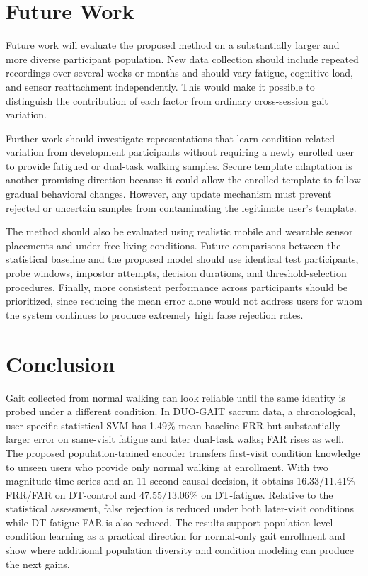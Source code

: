 \documentclass[conference]{IEEEtran}
\begin{document}
\section{Future Work}

Future work will evaluate the proposed method on a substantially larger and more diverse participant population. New data collection should include repeated recordings over several weeks or months and should vary fatigue, cognitive load, and sensor reattachment independently. This would make it possible to distinguish the contribution of each factor from ordinary cross-session gait variation.

Further work should investigate representations that learn condition-related variation from development participants without requiring a newly enrolled user to provide fatigued or dual-task walking samples. Secure template adaptation is another promising direction because it could allow the enrolled template to follow gradual behavioral changes. However, any update mechanism must prevent rejected or uncertain samples from contaminating the legitimate user’s template.

The method should also be evaluated using realistic mobile and wearable sensor placements and under free-living conditions. Future comparisons between the statistical baseline and the proposed model should use identical test participants, probe windows, impostor attempts, decision durations, and threshold-selection procedures. Finally, more consistent performance across participants should be prioritized, since reducing the mean error alone would not address users for whom the system continues to produce extremely high false rejection rates.

\section{Conclusion}
Gait collected from normal walking can look reliable until the same identity is probed under a different condition. In DUO-GAIT sacrum data, a chronological, user-specific statistical SVM has 1.49\% mean baseline FRR but substantially larger error on same-visit fatigue and later dual-task walks; FAR rises as well. The proposed population-trained encoder transfers first-visit condition knowledge to unseen users who provide only normal walking at enrollment. With two magnitude time series and an 11-second causal decision, it obtains 16.33/11.41\% FRR/FAR on DT-control and 47.55/13.06\% on DT-fatigue. Relative to the statistical assessment, false rejection is reduced under both later-visit conditions while DT-fatigue FAR is also reduced. The results support population-level condition learning as a practical direction for normal-only gait enrollment and show where additional population diversity and condition modeling can produce the next gains.



\end{document}
